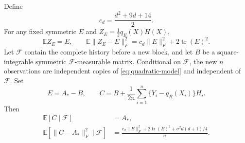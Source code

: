 \begin{theorem}
\label{thm:residual-variance}
Define
\[
 c_d=\frac{d^2+9d+14}{2}.
\]
For any fixed symmetric $E$ and $Z_E=\tfrac12q_E(X)H(X)$,
\begin{equation}
 \mathbb E Z_E=E,\qquad
 \mathbb E\|Z_E-E\|_F^2
 =c_d\|E\|_F^2+2\operatorname{tr}(E)^2.
 \label{eq:exact-design-variance}
\end{equation}
Let $\mathcal F$ contain the complete history before a new block, and
let $B$ be a square-integrable symmetric $\mathcal F$-measurable matrix.
Conditional
on $\mathcal F$, the new $n$ observations are independent copies of
\eqref{eq:quadratic-model} and independent of $\mathcal F$. Set
\[
 E=A_*-B,\qquad
 C=B+\frac1{2n}\sum_{i=1}^n
             \{Y_i-q_B(X_i)\}H_i.
\]
Then
\begin{align}
 \mathbb E[C\mid\mathcal F]&=A_*,\\
 \mathbb E[\|C-A_*\|_F^2\mid\mathcal F]
 &=\frac{c_d\|E\|_F^2+2\operatorname{tr}(E)^2
                +\sigma^2d(d+1)/4}{n}.
 \label{eq:fresh-conditional-variance}
\end{align}
\end{theorem}
